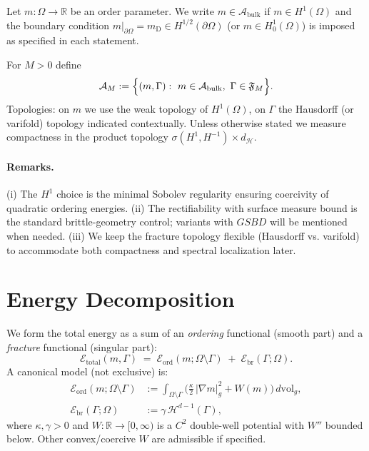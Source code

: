 \begin{definition}\label{def:admissible-m}
Let $m:\Omega\to\mathbb{R}$ be an order parameter. We write $m\in\mathcal{A}_{\mathrm{bulk}}$ if $m\in H^1(\Omega)$ and the boundary condition $m|_{\partial\Omega}=m_\mathrm{D}\in H^{1/2}(\partial\Omega)$ (or $m\in H^1_0(\Omega)$) is imposed as specified in each statement.
\end{definition}

\begin{definition}\label{def:admissible-config}
For $M>0$ define
\[
  \mathcal{A}_M := \Bigl\{(m,\Gamma):\ m\in\mathcal{A}_{\mathrm{bulk}},\ \Gamma\in\mathfrak{F}_M\Bigr\}.
\]
Topologies: on $m$ we use the weak topology of $H^1(\Omega)$, on $\Gamma$ the Hausdorff (or varifold) topology indicated contextually. Unless otherwise stated we measure compactness in the product topology $\sigma(H^1,\!H^{-1}) \times d_{\mathcal{H}}$.
\end{definition}

\paragraph{Remarks.}
(i) The $H^1$ choice is the minimal Sobolev regularity ensuring coercivity of quadratic ordering energies. (ii) The rectifiability with surface measure bound is the standard brittle-geometry control; variants with $GSBD$ will be mentioned when needed. (iii) We keep the fracture topology flexible (Hausdorff vs. varifold) to accommodate both compactness and spectral localization later.

\section{Energy Decomposition}\label{sec:energy}
We form the total energy as a sum of an \emph{ordering} functional (smooth part) and a \emph{fracture} functional (singular part):
\begin{equation}\label{eq:energy-decomp}
  \mathcal{E}_{\mathrm{total}}(m,\Gamma) \;=\; \mathcal{E}_{\mathrm{ord}}(m;\Omega\setminus\Gamma)\;+\;\mathcal{E}_{\mathrm{br}}(\Gamma;\Omega).
\end{equation}
A canonical model (not exclusive) is:
\begin{align}
  \mathcal{E}_{\mathrm{ord}}(m;\Omega\setminus\Gamma) 
    &:= \int_{\Omega\setminus\Gamma} \bigl( \tfrac{\kappa}{2}\,|\nabla m|_g^2 + W(m) \bigr)\, d\mathrm{vol}_g, 
    \label{eq:Eord}\\
  \mathcal{E}_{\mathrm{br}}(\Gamma;\Omega)
    &:= \gamma\,\mathcal{H}^{d-1}(\Gamma),
    \label{eq:Ebr}
\end{align}
where $\kappa,\gamma>0$ and $W:\mathbb{R}\to[0,\infty)$ is a $C^2$ double-well potential with $W''$ bounded below. Other convex/coercive $W$ are admissible if specified.

